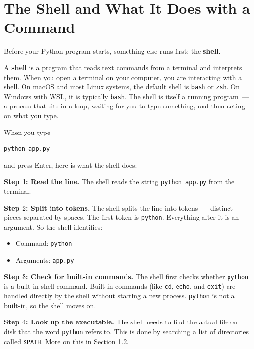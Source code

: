 \setcounter{section}{0}
\section{The Shell and What It Does with a Command}\label{01-command-to-process:11-the-shell-and-what-it-does-with-a-command}

Before your Python program starts, something else runs first: the \textbf{shell}.

A \textbf{shell} is a program that reads text commands from a terminal and interprets them. When you open a terminal on your computer, you are interacting with a shell. On macOS and most Linux systems, the default shell is \texttt{bash} or \texttt{zsh}. On Windows with WSL, it is typically \texttt{bash}. The shell is itself a running program~--- a process that sits in a loop, waiting for you to type something, and then acting on what you type.

When you type:

\begin{outputbox}[short]
\begin{Verbatim}[fontsize=\codesize, breaklines, breakanywhere, breaksymbolleft={\tiny\textcolor{muted}{$\hookrightarrow$}}]
python app.py
\end{Verbatim}
\end{outputbox}

\noindent{}and press Enter, here is what the shell does:

\textbf{Step 1: Read the line.} The shell reads the string \texttt{python\ app.py} from the terminal.

\textbf{Step 2: Split into tokens.} The shell splits the line into tokens~--- distinct pieces separated by spaces. The first token is \texttt{python}. Everything after it is an argument. So the shell identifies:

\begin{itemize}
\tightlist
\item
  Command: \texttt{python}
\item
  Arguments: \texttt{app.py}
\end{itemize}

\noindent{}\textbf{Step 3: Check for built-in commands.} The shell first checks whether \texttt{python} is a built-in shell command. Built-in commands (like \texttt{cd}, \texttt{echo}, and \texttt{exit}) are handled directly by the shell without starting a new process. \texttt{python} is not a built-in, so the shell moves on.

\textbf{Step 4: Look up the executable.} The shell needs to find the actual file on disk that the word \texttt{python} refers to. This is done by searching a list of directories called \texttt{\$PATH}. More on this in Section 1.2.

